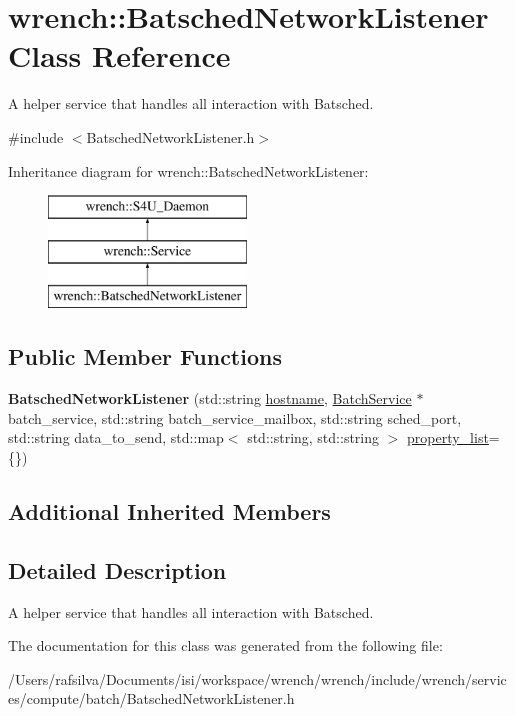 \hypertarget{classwrench_1_1_batsched_network_listener}{}\section{wrench\+:\+:Batsched\+Network\+Listener Class Reference}
\label{classwrench_1_1_batsched_network_listener}


A helper service that handles all interaction with Batsched.  




{\ttfamily \#include $<$Batsched\+Network\+Listener.\+h$>$}

Inheritance diagram for wrench\+:\+:Batsched\+Network\+Listener\+:\begin{figure}[H]
\begin{center}
\leavevmode
\includegraphics[height=3.000000cm]{classwrench_1_1_batsched_network_listener}
\end{center}
\end{figure}
\subsection*{Public Member Functions}
\begin{DoxyCompactItemize}
\item 
\mbox{\label{classwrench_1_1_batsched_network_listener_ad462bfbeaba074700086afc8c4a5469e}} 
{\bfseries Batsched\+Network\+Listener} (std\+::string \hyperlink{classwrench_1_1_s4_u___daemon_a52bc0b9a6cd248310749dac086819f00}{hostname}, \hyperlink{classwrench_1_1_batch_service}{Batch\+Service} $\ast$batch\+\_\+service, std\+::string batch\+\_\+service\+\_\+mailbox, std\+::string sched\+\_\+port, std\+::string data\+\_\+to\+\_\+send, std\+::map$<$ std\+::string, std\+::string $>$ \hyperlink{classwrench_1_1_service_a032143b1e2d7296dde9b4ca1e34845ce}{property\+\_\+list}=\{\})
\end{DoxyCompactItemize}
\subsection*{Additional Inherited Members}


\subsection{Detailed Description}
A helper service that handles all interaction with Batsched. 

The documentation for this class was generated from the following file\+:\begin{DoxyCompactItemize}
\item 
/\+Users/rafsilva/\+Documents/isi/workspace/wrench/wrench/include/wrench/services/compute/batch/Batsched\+Network\+Listener.\+h\end{DoxyCompactItemize}
